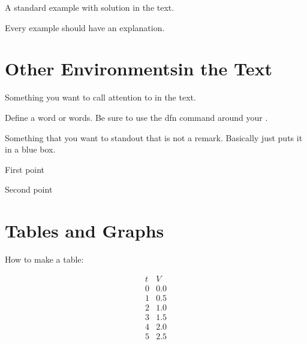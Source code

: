 \documentclass[nooutcomes]{ximera}
\begin{document}
\begin{example}
A standard example with solution in the text.
	\begin{explanation}
	Every example should have an explanation.
	\end{explanation}
\end{example}



\section{Other Environmentsin the Text}

\begin{remark}
Something you want to call attention to in the text.
\end{remark}


\begin{definition}
Define a word or words.  Be sure to use the dfn command around your .
\end{definition}


\begin{callout}
Something that you want to standout that is not a remark.  Basically just puts it in a blue box.
\end{callout}

\begin{summary}
\item First point
\item Second point
\end{summary}



\section{Tables and Graphs}

How to make a table:


\[
\begin{array}{cc}
t&V\\
\hline
0&0.0\\
1&0.5\\
2&1.0\\
3&1.5\\
4&2.0\\
5&2.5
\end{array}
\]
\end{document}
